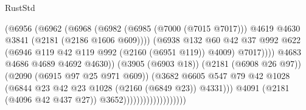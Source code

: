 \begin{lexlean}{RustStd}
\begin{coremodule}
                                                  (@6956
                                                    (@6962
                                                      (@6968
                                                        (@6982
                                                          (@6985 (@7000 (@7015 @7017)))
                                                          @4619
                                                          @4630
                                                          @3841
                                                          (@2181 (@2186 @1606 @609))))
                                                      (@6938
                                                        @132
                                                        @60
                                                        @42
                                                        @37
                                                        @992
                                                        @622
                                                        (@6946
                                                          @119
                                                          @42
                                                          @119
                                                          @992
                                                          (@2160 (@6951 @119))
                                                          @4009)
                                                        @7017))))
                                                @4683
                                                @4686
                                                @4689
                                                @4692
                                                @4630))
                                            (@3905 (@6903 @18))
                                            (@2181 (@6908 @26 @97))
                                            (@2090 (@6915 @97 @25 @971 @609))
                                            (@3682
                                              @6605
                                              @547
                                              @79
                                              @42
                                              @1028
                                              (@6844 @23 @42 @23 @1028 (@2160 (@6849 @23)) @4331)))
                                          @4091
                                          (@2181 (@4096 @42 @437 @27))
                                          @3652)))))))))))))))))))

\end{coremodule}
\end{lexlean}
